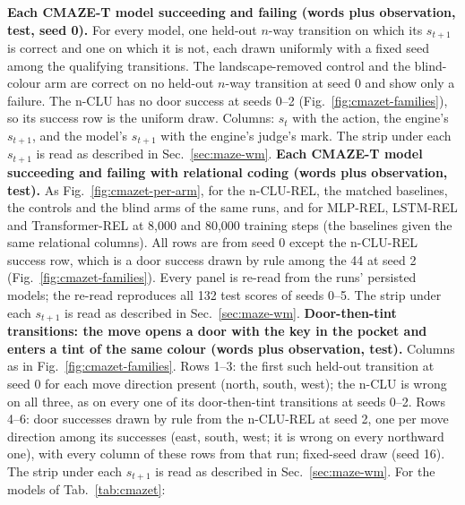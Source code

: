 \textbf{Each CMAZE-T model succeeding and failing (words plus observation, test, seed 0).} For every model, one held-out $n$-way transition on which its $s_{t+1}$ is correct and one on which it is not, each drawn uniformly with a fixed seed among the qualifying transitions. The landscape-removed control and the blind-colour arm are correct on no held-out $n$-way transition at seed 0 and show only a failure. The n-CLU has no door success at seeds 0--2 (Fig.~\ref{fig:cmazet-families}), so its success row is the uniform draw. Columns: $s_t$ with the action, the engine's $s_{t+1}$, and the model's $s_{t+1}$ with the engine's judge's mark. The strip under each $s_{t+1}$ is read as described in Sec.~\ref{sec:maze-wm}.
\textbf{Each CMAZE-T model succeeding and failing with relational coding (words plus observation, test).} As Fig.~\ref{fig:cmazet-per-arm}, for the n-CLU-REL, the matched baselines, the controls and the blind arms of the same runs, and for MLP-REL, LSTM-REL and Transformer-REL at 8,000 and 80,000 training steps (the baselines given the same relational columns). All rows are from seed 0 except the n-CLU-REL success row, which is a door success drawn by rule among the 44 at seed 2 (Fig.~\ref{fig:cmazet-families}). Every panel is re-read from the runs' persisted models; the re-read reproduces all 132 test scores of seeds 0--5. The strip under each $s_{t+1}$ is read as described in Sec.~\ref{sec:maze-wm}.
\textbf{Door-then-tint transitions: the move opens a door with the key in the pocket and enters a tint of the same colour (words plus observation, test).} Columns as in Fig.~\ref{fig:cmazet-families}. Rows 1--3: the first such held-out transition at seed 0 for each move direction present (north, south, west); the n-CLU is wrong on all three, as on every one of its door-then-tint transitions at seeds 0--2. Rows 4--6: door successes drawn by rule from the n-CLU-REL at seed 2, one per move direction among its successes (east, south, west; it is wrong on every northward one), with every column of these rows from that run; fixed-seed draw (seed 16). The strip under each $s_{t+1}$ is read as described in Sec.~\ref{sec:maze-wm}. For the models of Tab.~\ref{tab:cmazet}: 
